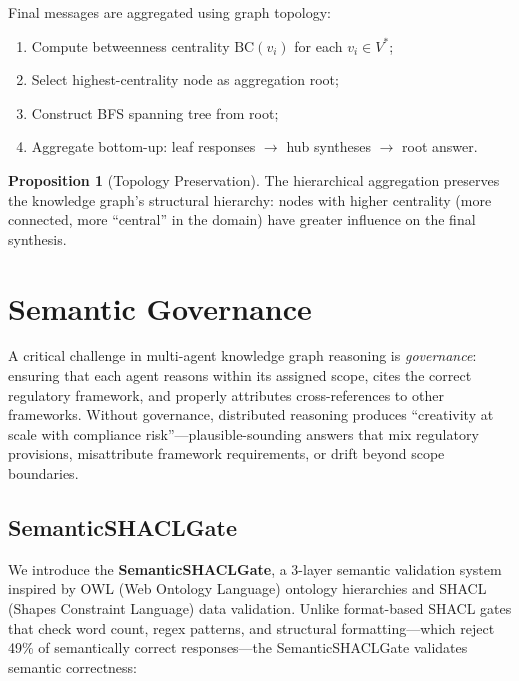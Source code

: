 \documentclass[a4paper,11pt]{article}
\theoremstyle{definition}
\newtheorem{proposition}{Proposition}[section]
\begin{document}
Final messages are aggregated using graph topology:

\begin{enumerate}
\item Compute betweenness centrality $\mathrm{BC}(v_i)$ for each $v_i \in V^*$;
\item Select highest-centrality node as aggregation root;
\item Construct BFS spanning tree from root;
\item Aggregate bottom-up: leaf responses $\to$ hub syntheses $\to$ root answer.
\end{enumerate}

\begin{proposition}[Topology Preservation]
The hierarchical aggregation preserves the knowledge graph's structural hierarchy: nodes with higher centrality (more connected, more ``central'' in the domain) have greater influence on the final synthesis.
\end{proposition}

\section{Semantic Governance}
\label{sec:governance}

A critical challenge in multi-agent knowledge graph reasoning is \textit{governance}: ensuring that each agent reasons within its assigned scope, cites the correct regulatory framework, and properly attributes cross-references to other frameworks. Without governance, distributed reasoning produces ``creativity at scale with compliance risk''---plausible-sounding answers that mix regulatory provisions, misattribute framework requirements, or drift beyond scope boundaries.

\subsection{SemanticSHACLGate}
\label{sec:shacl_gate}

We introduce the \textbf{SemanticSHACLGate}, a 3-layer semantic validation system inspired by OWL (Web Ontology Language) ontology hierarchies and SHACL (Shapes Constraint Language) data validation. Unlike format-based SHACL gates that check word count, regex patterns, and structural formatting---which reject 49\% of semantically correct responses---the SemanticSHACLGate validates semantic correctness:
\end{document}
